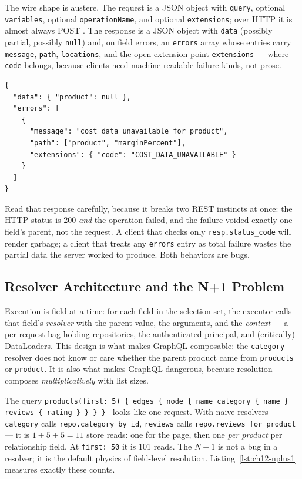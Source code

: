 The wire shape is austere. The request is a JSON object with
\texttt{query}, optional \texttt{variables}, optional
\texttt{operationName}, and optional \texttt{extensions}; over HTTP it is
almost always POST \cite{rfc9110}. The response is a JSON object with
\texttt{data} (possibly partial, possibly \texttt{null}) and, on field
errors, an \texttt{errors} array whose entries carry \texttt{message},
\texttt{path}, \texttt{locations}, and the open extension point
\texttt{extensions} --- where \texttt{code} belongs, because clients need
machine-readable failure kinds, not prose.

\begin{verbatim}
{
  "data": { "product": null },
  "errors": [
    {
      "message": "cost data unavailable for product",
      "path": ["product", "marginPercent"],
      "extensions": { "code": "COST_DATA_UNAVAILABLE" }
    }
  ]
}
\end{verbatim}

Read that response carefully, because it breaks two REST instincts at
once: the HTTP status is 200 \emph{and} the operation failed, and the
failure voided exactly one field's parent, not the request. A client that
checks only \texttt{resp.status\_code} will render garbage; a client that
treats any \texttt{errors} entry as total failure wastes the partial data
the server worked to produce. Both behaviors are bugs.

\subsection{Resolver Architecture and the N+1 Problem}
\label{sec:ch12-resolvers}

Execution is field-at-a-time: for each field in the selection set, the
executor calls that field's \emph{resolver} with the parent value, the
arguments, and the \emph{context} --- a per-request bag holding
repositories, the authenticated principal, and (critically) DataLoaders.
This design is what makes GraphQL composable: the \texttt{category}
resolver does not know or care whether the parent product came from
\texttt{products} or \texttt{product}. It is also what makes GraphQL
dangerous, because resolution composes \emph{multiplicatively} with list
sizes.

\begin{examplebox}
The query \texttt{products(first: 5) \{ edges \{ node \{ name category
\{ name \} reviews \{ rating \} \} \} \} } looks like one request. With
naive resolvers --- \texttt{category} calls
\texttt{repo.category\_by\_id}, \texttt{reviews} calls
\texttt{repo.reviews\_for\_product} --- it is $1 + 5 + 5 = 11$ store
reads: one for the page, then one \emph{per product} per relationship
field. At \texttt{first: 50} it is 101 reads. The $N{+}1$ is not a bug in
a resolver; it is the default physics of field-level resolution.
Listing~\ref{lst:ch12-nplus1} measures exactly these counts.
\end{examplebox}

